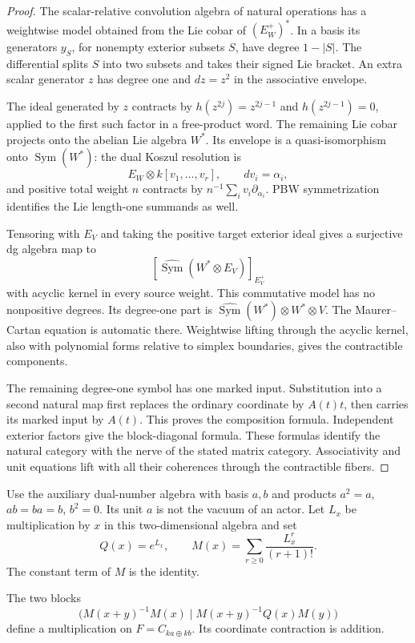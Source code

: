 \begin{proof}
The scalar-relative convolution algebra of natural
operations has a weightwise model obtained from the
Lie cobar of $(E_W^+)^*$. In a basis its generators
$y_S$, for nonempty exterior subsets $S$, have degree
$1-|S|$. The differential splits $S$ into two subsets
and takes their signed Lie bracket. An extra scalar
generator $z$ has degree one and $dz=z^2$ in the
associative envelope.

The ideal generated by $z$ contracts by
$h(z^{2j})=z^{2j-1}$ and $h(z^{2j-1})=0$, applied
to the first such factor in a free-product word.
The remaining Lie cobar projects onto the abelian
Lie algebra $W^*$. Its envelope is a quasi-isomorphism
onto $\operatorname{Sym}(W^*)$: the dual Koszul
resolution is
\[
 E_W\otimes k[v_1,\ldots,v_r],\qquad dv_i=\alpha_i,
\]
and positive total weight $n$ contracts by
$n^{-1}\sum_i v_i\partial_{\alpha_i}$.
PBW symmetrization identifies the Lie length-one
summands as well.

Tensoring with $E_V$ and taking the positive target
exterior ideal gives a surjective dg algebra map to
\[
 \left[\widehat{\operatorname{Sym}}(W^*\otimes E_V)
                                            \right]_{E_V^+}
\]
with acyclic kernel in every source weight. This
commutative model has no nonpositive degrees. Its
degree-one part is
$\widehat{\operatorname{Sym}}(W^*)\otimes W^*\otimes V$.
The Maurer--Cartan equation is automatic there.
Weightwise lifting through the acyclic kernel, also
with polynomial forms relative to simplex boundaries,
gives the contractible components.

The remaining degree-one symbol has one marked input.
Substitution into a second natural map first replaces
the ordinary coordinate by $A(t)t$, then carries its
marked input by $A(t)$. This proves the composition
formula. Independent exterior factors give the
block-diagonal formula. These formulas identify the
natural category with the nerve of the stated matrix
category. Associativity and unit equations lift with
all their coherences through the contractible fibers.
\end{proof}

Use the auxiliary dual-number algebra with basis $a,b$
and products $a^2=a$, $ab=ba=b$, $b^2=0$. Its unit $a$
is not the vacuum of an actor. Let $L_x$ be multiplication
by $x$ in this two-dimensional algebra and set
\[
 Q(x)=e^{L_x},\qquad
 M(x)=\sum_{r\geq0}\frac{L_x^r}{(r+1)!}.
\]
The constant term of $M$ is the identity. 

The two
blocks
\begin{equation}\label{mht:eq:actor-frame-product}
 \bigl(M(x+y)^{-1}M(x)\mid
        M(x+y)^{-1}Q(x)M(y)\bigr)
\end{equation}
define a multiplication on
$F=C_{ka\oplus kb}$. Its coordinate contraction is
addition. 

